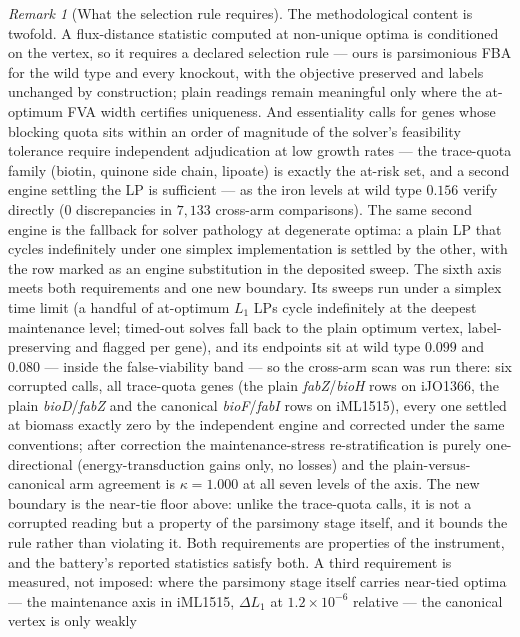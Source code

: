 \documentclass[11pt,a4paper]{article}
\theoremstyle{plain}
\theoremstyle{definition}
\theoremstyle{remark}
\newtheorem{remark}[theorem]{Remark}
\begin{document}
\begin{remark}[What the selection rule requires]
\label{rem:canonical-protocol}
The methodological content is twofold. A flux-distance statistic
computed at non-unique optima is conditioned on the vertex, so it
requires a declared selection rule --- ours is parsimonious FBA for
the wild type and every knockout, with the objective preserved and
labels unchanged by construction; plain readings remain meaningful
only where the at-optimum FVA width certifies uniqueness. And
essentiality calls for genes whose blocking quota sits within an
order of magnitude of the solver's feasibility tolerance require
independent adjudication at low growth rates --- the trace-quota
family (biotin, quinone side chain, lipoate) is exactly the
at-risk set, and a second engine settling the LP is sufficient ---
as the iron levels at wild type $0.156$ verify directly ($0$
discrepancies in $7{,}133$ cross-arm comparisons). The same second
engine is the fallback for solver pathology at degenerate optima:
a plain LP that cycles indefinitely under one simplex
implementation is settled by the other, with the row marked as an
engine substitution in the deposited sweep. The sixth axis meets
both requirements and one new boundary. Its sweeps run under a
simplex time limit (a handful of at-optimum $L_1$ LPs cycle
indefinitely at the deepest maintenance level; timed-out solves
fall back to the plain optimum vertex, label-preserving and
flagged per gene), and its endpoints sit at wild type $0.099$ and
$0.080$ --- inside the false-viability band --- so the cross-arm
scan was run there: six corrupted calls, all trace-quota genes
(the plain \emph{fabZ}/\emph{bioH} rows on iJO1366, the plain
\emph{bioD}/\emph{fabZ} and the canonical \emph{bioF}/\emph{fabI}
rows on iML1515), every one settled at biomass exactly zero by
the independent engine and corrected under the same conventions;
after correction the maintenance-stress re-stratification is
purely one-directional (energy-transduction gains only, no
losses) and the plain-versus-canonical arm agreement is
$\kappa=1.000$ at all seven levels of the axis. The new boundary
is the near-tie floor above: unlike the trace-quota calls, it is
not a corrupted reading but a property of the parsimony stage
itself, and it bounds the rule rather than violating it. Both requirements are
properties of the instrument, and the battery's reported
statistics satisfy both. A third requirement is measured, not
imposed: where the parsimony stage itself carries near-tied optima
--- the maintenance axis in iML1515, $\Delta L_1$ at
$1.2\times10^{-6}$ relative --- the canonical vertex is only weakly

\end{remark}
\end{document}
